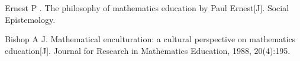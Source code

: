 
\begin{thebibliography}{200}
     Ernest P . The philosophy of mathematics education by Paul Ernest[J]. Social Epistemology.

     Bishop A J. Mathematical enculturation: a cultural perspective on mathematics education[J]. Journal for Research in Mathematics Education, 1988, 20(4):195.


\end{thebibliography}
